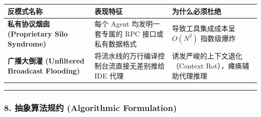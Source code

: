 {\def\LTcaptype{} %
\begin{longtable}[]{@{}
  >{\raggedright\arraybackslash}p{}
  >{\raggedright\arraybackslash}p{}
  >{\raggedright\arraybackslash}p{}@{}}
\toprule\noalign{}
\begin{minipage}[b]{\linewidth}\raggedright
反模式名称
\end{minipage} & \begin{minipage}[b]{\linewidth}\raggedright
表现特征
\end{minipage} & \begin{minipage}[b]{\linewidth}\raggedright
为什么必须杜绝
\end{minipage} \\
\midrule\noalign{}
\endhead
\bottomrule\noalign{}
\endlastfoot
\textbf{私有协议烟囱 (Proprietary Silo Syndrome)} & 每个 Agent
均发明一套专属的 RPC 接口或私有数据格式 & 导致工具集成成本呈 \(O(N^2)\)
指数级爆炸 \\
\textbf{广播大倒灌 (Unfiltered Broadcast Flooding)} &
将流水线的万行编译控制台流直接无差别推给 IDE 代理 &
诱发严峻的上下文退化（Context Rot），瘫痪辅助代理推理 \\
\end{longtable}
}

\begin{center}\rule{0.5\linewidth}{0.5pt}\end{center}

\subsubsection{8. 抽象算法规约 (Algorithmic
Formulation)}\label{ux62bdux8c61ux7b97ux6cd5ux89c4ux7ea6-algorithmic-formulation-10}

